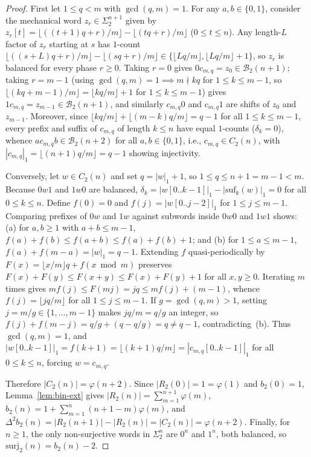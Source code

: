 \documentclass[11pt,a4paper]{article}
\theoremstyle{definition}
\newcommand{\surj}{\mathrm{surj}}
\begin{document}
\begin{proof}
First let $1 \le q < m$ with $\gcd(q, m) = 1$. For any $a, b \in \{0, 1\}$, consider the mechanical word $z_r \in \Sigma_2^{n+1}$ given by $z_r[t] = \lfloor((t+1)q + r)/m\rfloor - \lfloor(tq + r)/m\rfloor$ ($0 \le t \le n$). Any length-$L$ factor of $z_r$ starting at $s$ has $1$-count $\lfloor((s+L)q + r)/m\rfloor - \lfloor(sq + r)/m\rfloor \in \{\lfloor Lq/m\rfloor, \lfloor Lq/m\rfloor + 1\}$, so $z_r$ is balanced for every phase $r \ge 0$. Taking $r = 0$ gives $0 c_{m,q} = z_0 \in \mathcal{B}_2(n+1)$; taking $r = m - 1$ (using $\gcd(q, m) = 1 \implies m \nmid kq$ for $1 \le k \le m - 1$, so $\lfloor(kq + m - 1)/m\rfloor = \lfloor kq/m\rfloor + 1$ for $1 \le k \le m - 1$) gives $1 c_{m,q} = z_{m-1} \in \mathcal{B}_2(n+1)$, and similarly $c_{m,q} 0$ and $c_{m,q} 1$ are shifts of $z_0$ and $z_{m-1}$. Moreover, since $\lfloor kq/m\rfloor + \lfloor(m-k)q/m\rfloor = q - 1$ for all $1 \le k \le m - 1$, every prefix and suffix of $c_{m,q}$ of length $k \le n$ have equal $1$-counts ($\delta_k = 0$), whence $a c_{m,q} b \in \mathcal{B}_2(n+2)$ for all $a, b \in \{0, 1\}$, i.e., $c_{m,q} \in C_2(n)$, with $|c_{m,q}|_1 = \lfloor(n+1)q/m\rfloor = q - 1$ showing injectivity.

Conversely, let $w \in C_2(n)$ and set $q = |w|_1 + 1$, so $1 \le q \le n + 1 = m - 1 < m$. Because $0w1$ and $1w0$ are balanced, $\delta_k = |w[0..k-1]|_1 - |\mathrm{suf}_k(w)|_1 = 0$ for all $0 \le k \le n$. Define $f(0) = 0$ and $f(j) = |w[0..j-2]|_1$ for $1 \le j \le m - 1$. Comparing prefixes of $0w$ and $1w$ against subwords inside $0w0$ and $1w1$ shows: (a) for $a, b \ge 1$ with $a + b \le m - 1$, $f(a) + f(b) \le f(a + b) \le f(a) + f(b) + 1$; and (b) for $1 \le a \le m - 1$, $f(a) + f(m - a) = |w|_1 = q - 1$. Extending $f$ quasi-periodically by $F(x) = \lfloor x/m\rfloor q + f(x \bmod m)$ preserves $F(x) + F(y) \le F(x + y) \le F(x) + F(y) + 1$ for all $x, y \ge 0$. Iterating $m$ times gives $m f(j) \le F(mj) = jq \le m f(j) + (m - 1)$, whence $f(j) = \lfloor jq/m\rfloor$ for all $1 \le j \le m - 1$. If $g = \gcd(q, m) > 1$, setting $j = m/g \in \{1, \dots, m - 1\}$ makes $jq/m = q/g$ an integer, so $f(j) + f(m - j) = q/g + (q - q/g) = q \neq q - 1$, contradicting~(b). Thus $\gcd(q, m) = 1$, and $|w[0..k-1]|_1 = f(k + 1) = \lfloor(k+1)q/m\rfloor = |c_{m,q}[0..k-1]|_1$ for all $0 \le k \le n$, forcing $w = c_{m,q}$.

Therefore $|C_2(n)| = \varphi(n + 2)$. Since $|R_2(0)| = 1 = \varphi(1)$ and $b_2(0) = 1$, Lemma~\ref{lem:bin-ext} gives $|R_2(n)| = \sum_{m=1}^{n+1} \varphi(m)$, $b_2(n) = 1 + \sum_{m=1}^n (n + 1 - m)\varphi(m)$, and $\Delta^2 b_2(n) = |R_2(n+1)| - |R_2(n)| = |C_2(n)| = \varphi(n + 2)$. Finally, for $n \ge 1$, the only non-surjective words in $\Sigma_2^n$ are $0^n$ and $1^n$, both balanced, so $\surj_2(n) = b_2(n) - 2$.
\end{proof}
\end{document}
